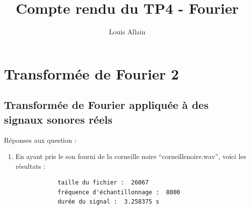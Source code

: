 \documentclass[12pt]{article}
\begin{document}
\title{Compte rendu du TP4 - Fourier}
\author{Louis Allain}
\maketitle

\section{Transformée de Fourier 2}

\subsection{Transformée de Fourier appliquée à des signaux sonores réels}

Réponses aux question :
\begin{enumerate}
	\item 
		En ayant pris le son fourni de la corneille noire "`corneillenoire.wav"', voici les résultats :
		\begin{verbatim}
			taille du fichier :  26067
			fréquence d'échantillonnage :  8000
			durée du signal :  3.258375 s
		\end{verbatim}
		

\end{enumerate}
\end{document}
